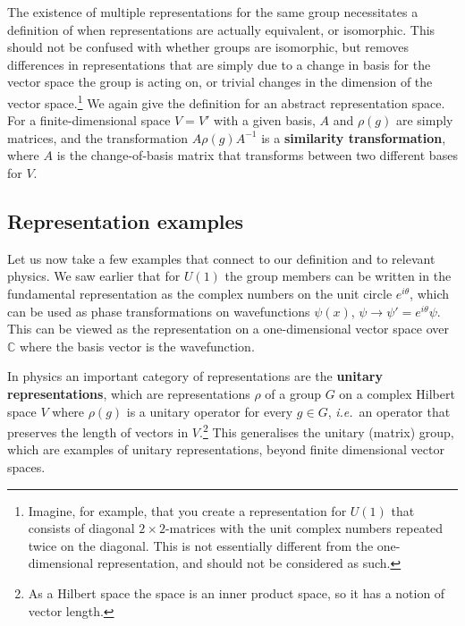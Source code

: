 \documentclass[notes.tex]{subfiles}
\begin{document}
The existence of multiple representations for the same group necessitates a definition of when representations are actually equivalent, or isomorphic. This should not be confused with whether groups are isomorphic, but removes differences in representations that are simply due to a change in basis for the vector space the group is acting on, or trivial changes in the dimension of the vector space.\footnote{Imagine, for example, that you create a representation for $U(1)$ that consists of diagonal $2\times2$-matrices with the unit complex numbers repeated twice on the diagonal. This is not essentially different from the one-dimensional representation, and should not be considered as such.} We again give the definition for an abstract representation space.  
For a finite-dimensional space $V=V'$ with a given basis, $A$ and $\rho(g)$ are simply matrices, and the transformation $A\rho(g)A^{-1} $ is a {\bf similarity transformation}, where $A$ is the change-of-basis matrix that transforms between two different bases for $V$.

\subsection{Representation examples}

Let us now take a few examples that connect to our definition and to relevant physics. We saw earlier that for $U(1)$ the group members can be written in the fundamental representation as the complex numbers on the unit circle $e^{i \theta}$, which can be used as phase transformations on wavefunctions $\psi(x)$, $\psi\to\psi'=e^{i\theta}\psi$. This can be viewed as the representation on a one-dimensional vector space over $\mathbb C$ where the basis vector is the wavefunction.

In physics an important category of representations are the {\bf unitary representations}, which are representations $\rho$ of a group $G$ on a complex Hilbert space $V$ where $\rho(g)$ is a unitary operator for every $g\in G$, {\it i.e.}\ an operator that preserves the length of vectors in $V$.\footnote{As a Hilbert space the space is an inner product space, so it has a notion of vector length.} This generalises the unitary (matrix) group, which are examples of unitary representations, beyond finite dimensional vector spaces.
\end{document}
